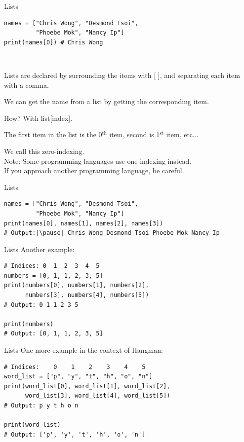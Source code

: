 \documentclass[dvipsnames, svgnames, x11names, handout]{beamer}
\begin{document}
\begin{frame}[fragile]{Lists}
\begin{verbatim}
names = ["Chris Wong", "Desmond Tsoi",
         "Phoebe Mok", "Nancy Ip"]
print(names[0]) # Chris Wong
\end{verbatim}

\

Lists are declared by surrounding the items with [ ], and separating each item with a comma.

We can get the name from a list by getting the corresponding item.

How? With list[index].

The first item in the list is the 0$^{\text{th}}$ item, second is 1$^{\text{st}}$ item, etc... 

We call this zero-indexing.\\

{\tiny Note: Some programming languages use one-indexing instead.\\[-1em]

\hspace{2.5em} If you approach another programming language, be careful.}
\end{frame}

\begin{frame}[fragile]{Lists}
\begin{verbatim}
names = ["Chris Wong", "Desmond Tsoi",
         "Phoebe Mok", "Nancy Ip"]
print(names[0], names[1], names[2], names[3]) 
# Output:|\pause| Chris Wong Desmond Tsoi Phoebe Mok Nancy Ip
\end{verbatim}
\end{frame}

\begin{frame}[fragile]{Lists}
Another example:
\begin{verbatim}
# Indices: 0  1  2  3  4  5
numbers = [0, 1, 1, 2, 3, 5]
print(numbers[0], numbers[1], numbers[2],
      numbers[3], numbers[4], numbers[5]) 
# Output: 0 1 1 2 3 5

print(numbers)
# Output: [0, 1, 1, 2, 3, 5]
\end{verbatim}
\end{frame}

\begin{frame}[fragile]{Lists}
One more example in the context of Hangman:
\begin{verbatim}
# Indices:    0    1    2    3    4    5
word_list = ["p", "y", "t", "h", "o", "n"]
print(word_list[0], word_list[1], word_list[2],
      word_list[3], word_list[4], word_list[5]) 
# Output: p y t h o n

print(word_list)
# Output: ['p', 'y', 't', 'h', 'o', 'n']
\end{verbatim}
\end{frame}
\end{document}
